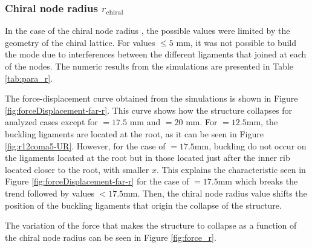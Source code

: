     \clearpage
    \subsubsection{Chiral node radius $r_{\mathrm{chiral}}$}

      In the case of the chiral node radius \chir, the possible values were limited by the geometry of the chiral lattice. For values \chir$\le 5$ mm, it was not possible to build the mode due to interferences between the different ligaments that joined at each of the nodes. The numeric results from the simulations are presented in Table \ref{tab:para_r}.

      The force-displacement curve obtained from the simulations is shown in Figure \ref{fig:forceDisplacement-far-r}. This curve shows how the structure collapses for analyzed cases except for \chir$ = 17.5$ mm and \chir$ = 20$ mm. For \chir$= 12.5$mm, the buckling ligaments are located at the root, as it can be seen in Figure \ref{fig:r12coma5-UR}. However, for the case of \chir$= 17.5$mm, buckling do not occur on the ligaments located at the root but in those located just after the inner rib located closer to the root, with smaller $x$. This explains the characteristic seen in Figure \ref{fig:forceDisplacement-far-r} for the case of \chir$= 17.5$mm which breaks the trend followed by values \chir$< 17.5$mm. Then, the chiral node radius \chir value shifts the position of the buckling ligaments that origin the collapse of the structure.

      The variation of the force that makes the structure to collapse as a function of the chiral node radius \chir can be seen in Figure \ref{fig:force_r}.

